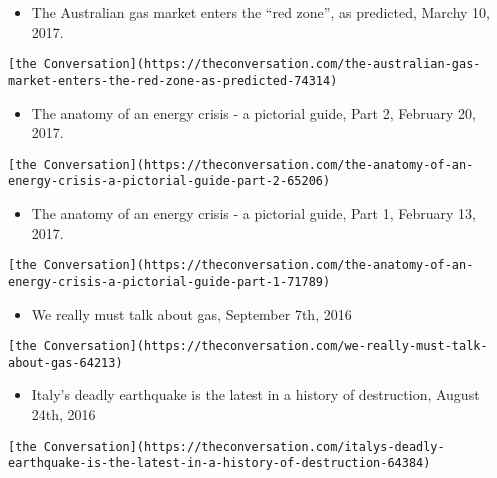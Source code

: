 \documentclass[
]{article}
\providecommand{\tightlist}{%
  \setlength{\itemsep}{0pt}\setlength{\parskip}{0pt}}
\begin{document}
\begin{itemize}
\tightlist
\item
  The Australian gas market enters the ``red zone'', as predicted,
  Marchy 10, 2017.
\end{itemize}

\begin{verbatim}
[the Conversation](https://theconversation.com/the-australian-gas-market-enters-the-red-zone-as-predicted-74314)
\end{verbatim}

\begin{itemize}
\tightlist
\item
  The anatomy of an energy crisis - a pictorial guide, Part 2, February
  20, 2017.
\end{itemize}

\begin{verbatim}
[the Conversation](https://theconversation.com/the-anatomy-of-an-energy-crisis-a-pictorial-guide-part-2-65206)
\end{verbatim}

\begin{itemize}
\tightlist
\item
  The anatomy of an energy crisis - a pictorial guide, Part 1, February
  13, 2017.
\end{itemize}

\begin{verbatim}
[the Conversation](https://theconversation.com/the-anatomy-of-an-energy-crisis-a-pictorial-guide-part-1-71789)
\end{verbatim}

\begin{itemize}
\tightlist
\item
  We really must talk about gas, September 7th, 2016
\end{itemize}

\begin{verbatim}
[the Conversation](https://theconversation.com/we-really-must-talk-about-gas-64213)
\end{verbatim}

\begin{itemize}
\tightlist
\item
  Italy's deadly earthquake is the latest in a history of destruction,
  August 24th, 2016
\end{itemize}

\begin{verbatim}
[the Conversation](https://theconversation.com/italys-deadly-earthquake-is-the-latest-in-a-history-of-destruction-64384)
\end{verbatim}
\end{document}
